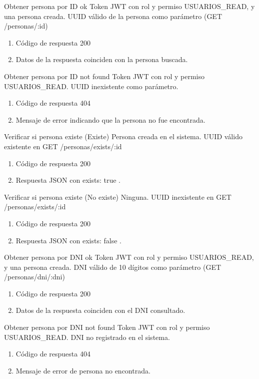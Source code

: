 {Obtener persona por ID ok}
{Token JWT con rol y permiso USUARIOS\_READ, y una persona creada.}
{UUID válido de la persona como parámetro (GET /personas/:id)}
{\begin{enumerate} [leftmargin=*, nosep]
    \item Código de respuesta 200
    \item Datos de la respuesta coinciden con la persona buscada.
\end{enumerate}}

{Obtener persona por ID not found}
{Token JWT con rol y permiso USUARIOS\_READ.}
{UUID inexistente como parámetro.}
{\begin{enumerate} [leftmargin=*, nosep]
    \item Código de respuesta 404
    \item Mensaje de error indicando que la persona no fue encontrada.
\end{enumerate}}

{Verificar si persona existe (Existe)}
{Persona creada en el sistema.}
{UUID válido existente en GET /personas/exists/:id}
{\begin{enumerate} [leftmargin=*, nosep]
    \item Código de respuesta 200
    \item Respuesta JSON con { exists: true }.
\end{enumerate}}

{Verificar si persona existe (No existe)}
{Ninguna.}
{UUID inexistente en GET /personas/exists/:id}
{\begin{enumerate} [leftmargin=*, nosep]
    \item Código de respuesta 200
    \item Respuesta JSON con { exists: false }.
\end{enumerate}}

{Obtener persona por DNI ok}
{Token JWT con rol y permiso USUARIOS\_READ, y una persona creada.}
{DNI válido de 10 dígitos como parámetro (GET /personas/dni/:dni)}
{\begin{enumerate} [leftmargin=*, nosep]
    \item Código de respuesta 200
    \item Datos de la respuesta coinciden con el DNI consultado.
\end{enumerate}}

{Obtener persona por DNI not found}
{Token JWT con rol y permiso USUARIOS\_READ.}
{DNI no registrado en el sistema.}
{\begin{enumerate} [leftmargin=*, nosep]
    \item Código de respuesta 404
    \item Mensaje de error de persona no encontrada.
\end{enumerate}}

